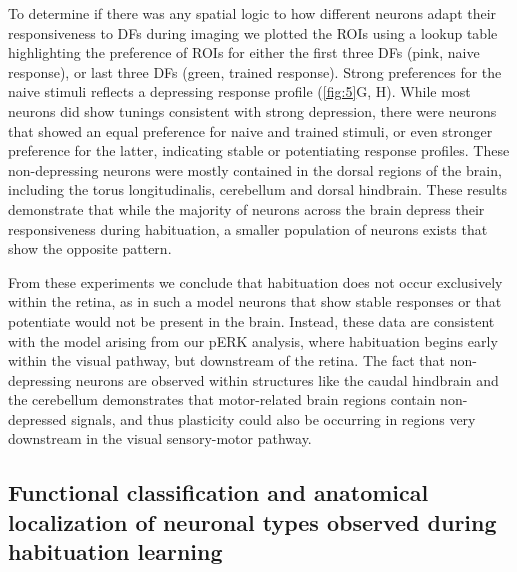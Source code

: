 \documentclass[9pt,lineno]{RandlettLab_elife}
\begin{document}
To determine if there was any spatial logic to how different neurons adapt their responsiveness to DFs during imaging we plotted the ROIs using a lookup table highlighting the preference of ROIs for either the first three DFs (pink, naive response), or last three DFs (green, trained response). Strong preferences for the naive stimuli reflects a depressing response profile (\autoref{fig:5}G, H). While most neurons did show tunings consistent with strong depression, there were neurons that showed an equal preference for naive and trained stimuli, or even stronger preference for the latter, indicating stable or potentiating response profiles. These non-depressing neurons were mostly contained in the dorsal regions of the brain, including the torus longitudinalis, cerebellum and dorsal hindbrain. These results demonstrate that while the majority of neurons across the brain depress their responsiveness during habituation, a smaller population of neurons exists that show the opposite pattern. 

From these experiments we conclude that habituation does not occur exclusively within the retina, as in such a model neurons that show stable responses or that potentiate would not be present in the brain. Instead, these data are consistent with the model arising from our pERK analysis, where habituation begins early within the visual pathway, but downstream of the retina. The fact that non-depressing neurons are observed within structures like the caudal hindbrain and the cerebellum demonstrates that motor-related brain regions contain non-depressed signals, and thus plasticity could also be occurring in regions very downstream in the visual sensory-motor pathway.
\pagebreak
\subsection{Functional classification and anatomical localization of neuronal types observed during habituation learning}
\end{document}
